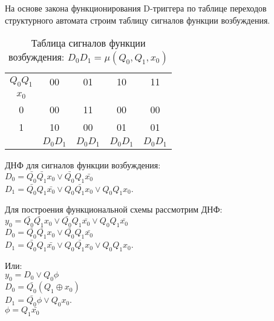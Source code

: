 \documentclass[a4paper,10pt]{article}
\begin{document}
			На основе закона функционирования D-триггера по таблице переходов структурного автомата
			строим таблицу сигналов функции возбуждения. \\

    		\begin{table}[h!]
				\center
            		\begin{tabular}{|c|c|c|c|c|}
            			\hline
                		 $Q_0Q_1$ & 00       & 01       & 10       & 11 \\ 
            			 $x_0$    &          &	        &	       &    \\ \hline
                			 0	  & 00       & 11       & 00       & 00 \\ \hline 
                			 1    & 10       & 00       & 01       & 01 \\ \hline
								  & $D_0D_1$ & $D_0D_1$ & $D_0D_1$ & $D_0D_1$ \\ \hline
            		\end{tabular}
    			\caption{Таблица сигналов функции возбуждения: $D_0D_1 = \mu(Q_0,Q_1,x_0)$}
    		\end{table}

        	ДНФ для сигналов функции возбуждения: \\
				$D_0 = \bar{Q_0} \bar{Q_1} x_0 \lor \bar{Q_0} Q_1 \bar{x_0}$ \\
				$D_1 = \bar{Q_0} Q_1 \bar{x_0} \lor Q_0 \bar{Q_1} x_0 \lor Q_0 Q_1 x_0$.

		Для построения функциональной схемы рассмотрим ДНФ: \\
    	$y_0 = \bar{Q_0} \bar{Q_1} x_0 \lor \bar{Q_0} Q_1 \bar{x_0} \lor Q_0 Q_1 \bar{x_0}$ \\
		$D_0 = \bar{Q_0} \bar{Q_1} x_0 \lor \bar{Q_0} Q_1 \bar{x_0}$ \\
		$D_1 = \bar{Q_0} Q_1 \bar{x_0} \lor Q_0 \bar{Q_1} x_0 \lor Q_0 Q_1 x_0$.

		Или: \\
    	$y_0 = D_0 \lor Q_0 \phi$ \\
		$D_0 = \bar{Q_0} ( Q_1 \oplus x_0)$ \\
		$D_1 = \bar{Q_0} \phi \lor Q_0  x_0 $. \\
		$\phi = Q_1 \bar{x_0}$
\end{document}
